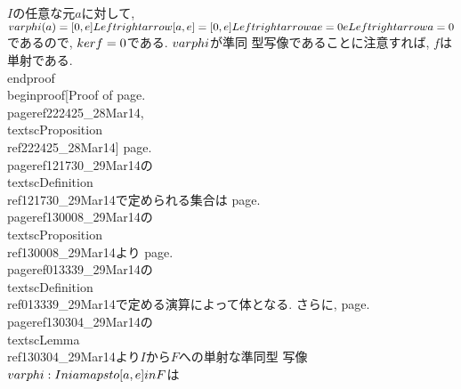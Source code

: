   $I$の任意な元$a$に対して,
  $\\varphi(a)=[0,e]\\Leftrightarrow[a,e]=[0,e]\\Leftrightarrow
  ae=0e\\Leftrightarrow a=0$であるので, $\\ker f=\\{0\\}$である. $\\varphi$が準同
  型写像であることに注意すれば, $f$は単射である.
 \\end{proof}
 \\begin{proof}[Proof of page.\\pageref{222425_28Mar14}, \\textsc{Proposition}~\\ref{222425_28Mar14}]
  page.\\pageref{121730_29Mar14}の\\textsc{Definition}~\\ref{121730_29Mar14}で定められる集合は
  page.\\pageref{130008_29Mar14}の\\textsc{Proposition}~\\ref{130008_29Mar14}より
  page.\\pageref{013339_29Mar14}の\\textsc{Definition}~\\ref{013339_29Mar14}で定める演算によって体となる.
  さらに, page.\\pageref{130304_29Mar14}の\\textsc{Lemma}~\\ref{130304_29Mar14}より$I$から$F$への単射な準同型
  写像$\\varphi:I\\ni a\\mapsto [a,e]\\in F$は
